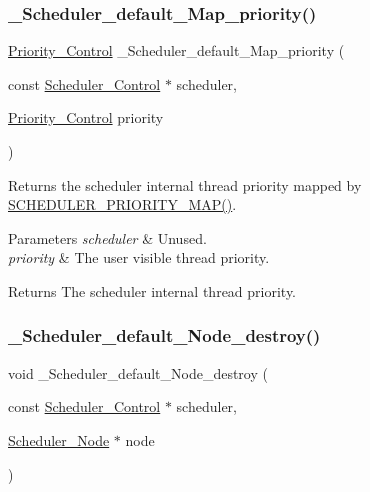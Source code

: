 \subsubsection{\texorpdfstring{\_Scheduler\_default\_Map\_priority()}{\_Scheduler\_default\_Map\_priority()}}
{\footnotesize\ttfamily \mbox{\hyperlink{group__RTEMSScorePriority_ga59d02b58072d31a9a1cfe644557aefe2}{Priority\+\_\+\+Control}} \+\_\+\+Scheduler\+\_\+default\+\_\+\+Map\+\_\+priority (\begin{DoxyParamCaption}\item[{const \mbox{\hyperlink{struct__Scheduler__Control}{Scheduler\+\_\+\+Control}} $\ast$}]{scheduler,  }\item[{\mbox{\hyperlink{group__RTEMSScorePriority_ga59d02b58072d31a9a1cfe644557aefe2}{Priority\+\_\+\+Control}}}]{priority }\end{DoxyParamCaption})}



Returns the scheduler internal thread priority mapped by \mbox{\hyperlink{group__RTEMSScoreScheduler_gabfbb467344bb96c6bbc1b5afe3442655}{S\+C\+H\+E\+D\+U\+L\+E\+R\+\_\+\+P\+R\+I\+O\+R\+I\+T\+Y\+\_\+\+M\+A\+P()}}. 


\begin{DoxyParams}{Parameters}
{\em scheduler} & Unused. \\
\hline
{\em priority} & The user visible thread priority.\\
\hline
\end{DoxyParams}
\begin{DoxyReturn}{Returns}
The scheduler internal thread priority. 
\end{DoxyReturn}
\mbox{\label{group__RTEMSScoreScheduler_ga51cd11696f0032cbd765cd9f13291079}} 
\subsubsection{\texorpdfstring{\_Scheduler\_default\_Node\_destroy()}{\_Scheduler\_default\_Node\_destroy()}}
{\footnotesize\ttfamily void \+\_\+\+Scheduler\+\_\+default\+\_\+\+Node\+\_\+destroy (\begin{DoxyParamCaption}\item[{const \mbox{\hyperlink{struct__Scheduler__Control}{Scheduler\+\_\+\+Control}} $\ast$}]{scheduler,  }\item[{\mbox{\hyperlink{structScheduler__Node}{Scheduler\+\_\+\+Node}} $\ast$}]{node }\end{DoxyParamCaption})}



